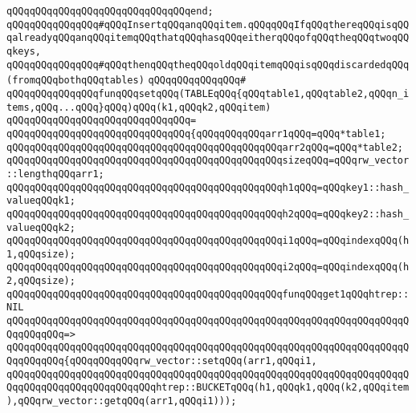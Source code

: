 \verb|qQQqqQQqqQQqqQQqqQQqqQQqqQQqqQQqend;|\newline
\newline
\verb|qQQqqQQqqQQqqQQq#qQQqInsertqQQqanqQQqitem.qQQqqQQqIfqQQqthereqQQqisqQQqalreadyqQQqanqQQqitemqQQqthatqQQqhasqQQqeitherqQQqofqQQqtheqQQqtwoqQQqkeys,|\newline
\verb|qQQqqQQqqQQqqQQq#qQQqthenqQQqtheqQQqoldqQQqitemqQQqisqQQqdiscardedqQQq(fromqQQqbothqQQqtables)|\newline
\verb|qQQqqQQqqQQqqQQq#|\newline
\verb|qQQqqQQqqQQqqQQqfunqQQqsetqQQq(TABLEqQQq{qQQqtable1,qQQqtable2,qQQqn_items,qQQq...qQQq}qQQq)qQQq(k1,qQQqk2,qQQqitem)|\newline
\verb|qQQqqQQqqQQqqQQqqQQqqQQqqQQqqQQq=|\newline
\verb|qQQqqQQqqQQqqQQqqQQqqQQqqQQqqQQq{qQQqqQQqqQQqarr1qQQq=qQQq*table1;|\newline
\verb|qQQqqQQqqQQqqQQqqQQqqQQqqQQqqQQqqQQqqQQqqQQqqQQqarr2qQQq=qQQq*table2;|\newline
\newline
\verb|qQQqqQQqqQQqqQQqqQQqqQQqqQQqqQQqqQQqqQQqqQQqqQQqsizeqQQq=qQQqrw_vector::lengthqQQqarr1;|\newline
\newline
\verb|qQQqqQQqqQQqqQQqqQQqqQQqqQQqqQQqqQQqqQQqqQQqqQQqh1qQQq=qQQqkey1::hash_valueqQQqk1;|\newline
\verb|qQQqqQQqqQQqqQQqqQQqqQQqqQQqqQQqqQQqqQQqqQQqqQQqh2qQQq=qQQqkey2::hash_valueqQQqk2;|\newline
\newline
\verb|qQQqqQQqqQQqqQQqqQQqqQQqqQQqqQQqqQQqqQQqqQQqqQQqi1qQQq=qQQqindexqQQq(h1,qQQqsize);|\newline
\verb|qQQqqQQqqQQqqQQqqQQqqQQqqQQqqQQqqQQqqQQqqQQqqQQqi2qQQq=qQQqindexqQQq(h2,qQQqsize);|\newline
\newline
\verb|qQQqqQQqqQQqqQQqqQQqqQQqqQQqqQQqqQQqqQQqqQQqqQQqfunqQQqget1qQQqhtrep::NIL|\newline
\verb|qQQqqQQqqQQqqQQqqQQqqQQqqQQqqQQqqQQqqQQqqQQqqQQqqQQqqQQqqQQqqQQqqQQqqQQqqQQqqQQq=>|\newline
\verb|qQQqqQQqqQQqqQQqqQQqqQQqqQQqqQQqqQQqqQQqqQQqqQQqqQQqqQQqqQQqqQQqqQQqqQQqqQQqqQQq{qQQqqQQqqQQqrw_vector::setqQQq(arr1,qQQqi1,|\newline
\verb|qQQqqQQqqQQqqQQqqQQqqQQqqQQqqQQqqQQqqQQqqQQqqQQqqQQqqQQqqQQqqQQqqQQqqQQqqQQqqQQqqQQqqQQqqQQqqQQqhtrep::BUCKETqQQq(h1,qQQqk1,qQQq(k2,qQQqitem),qQQqrw_vector::getqQQq(arr1,qQQqi1)));|\newline
